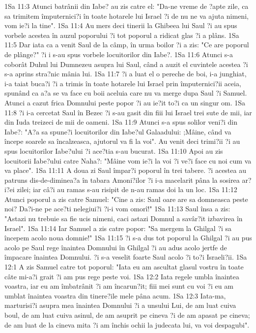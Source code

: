 1Sa 11:3  Atunci batrânii din Iabe? au zis catre el: "Da-ne vreme de ?apte zile, ca sa trimitem împuternici?i în toate hotarele lui Israel ?i de nu ne va ajuta nimeni, vom ie?i la tine".
1Sa 11:4  Au mers deci tinerii la Ghibeea lui Saul ?i au spus vorbele acestea în auzul poporului ?i tot poporul a ridicat glas ?i a plâns.
1Sa 11:5  Dar iata ca a venit Saul de la câmp, în urma boilor ?i a zis: "Ce are poporul de plânge?" ?i i s-au spus vorbele locuitorilor din Iabe?.
1Sa 11:6  Atunci s-a coborât Duhul lui Dumnezeu asupra lui Saul, când a auzit el cuvintele acestea ?i s-a aprins stra?nic mânia lui.
1Sa 11:7  ?i a luat el o pereche de boi, i-a junghiat, i-a taiat buca?i ?i a trimis în toate hotarele lui Israel prin împuternici?ii aceia, spunând ca a?a se va face cu boii aceluia care nu va merge dupa Saul ?i Samuel. Atunci a cazut frica Domnului peste popor ?i au ie?it to?i ca un singur om.
1Sa 11:8  ?i i-a cercetat Saul în Bezec ?i s-au gasit din fiii lui Israel trei sute de mii, iar din Iuda treizeci de mii de oameni.
1Sa 11:9  Atunci s-a spus solilor veni?i din Iabe?: "A?a sa spune?i locuitorilor din Iabe?ul Galaadului: ;Mâine, când va începe soarele sa încalzeasca, ajutorul va fi la voi". Au venit deci trimi?ii ?i au spus locuitorilor Iabe?ului ?i ace?tia s-au bucurat.
1Sa 11:10  Apoi au zis locuitorii Iabe?ului catre Naha?: "Mâine vom ie?i la voi ?i ve?i face cu noi cum va va place".
1Sa 11:11  A doua zi Saul împar?i poporul în trei tabere. ?i acestea au patruns dis-de-diminea?a în tabara Amoni?ilor ?i i-a macelarit pâna la sosirea ar?i?ei zilei; iar câ?i au ramas s-au risipit de n-au ramas doi la un loc.
1Sa 11:12  Atunci poporul a zis catre Samuel: "Cine a zis: Saul oare are sa domneasca peste noi? Da?i-ne pe ace?ti nelegiui?i ?i-i vom omorî!"
1Sa 11:13  Saul însa a zis: "Astazi nu trebuie sa fie ucis nimeni, caci astazi Domnul a savâr?it izbavirea în Israel".
1Sa 11:14  Iar Samuel a zis catre popor: "Sa mergem la Ghilgal ?i sa începem acolo noua domnie!"
1Sa 11:15  ?i s-a dus tot poporul la Ghilgal ?i au pus acolo pe Saul rege înaintea Domnului în Ghilgal ?i au adus acolo jertfe de împacare înaintea Domnului. ?i s-a veselit foarte Saul acolo ?i to?i Israeli?ii.
1Sa 12:1  A zis Samuel catre tot poporul: "Iata eu am ascultat glasul vostru în toate câte mi-a?i grait ?i am pus rege peste voi.
1Sa 12:2  Iata regele umbla înaintea voastra, iar eu am îmbatrânit ?i am încarun?it; fiii mei sunt cu voi ?i eu am umblat înaintea voastra din tinere?ile mele pâna acum.
1Sa 12:3  Iata-ma, marturisi?i asupra mea înaintea Domnului ?i a unsului Lui, de am luat cuiva boul, de am luat cuiva asinul, de am asuprit pe cineva ?i de am apasat pe cineva; de am luat de la cineva mita ?i am închis ochii la judecata lui, va voi despagubi".

